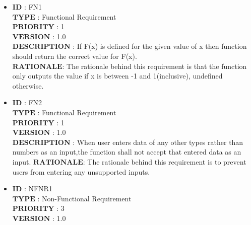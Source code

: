 \documentclass[a4paper,10pt]{report}
\begin{document}
\begin{itemize}
 \item $\textbf{ID}$\hspace{2.51cm}   : FN1\\
   $\textbf{TYPE}$\hspace{1.85cm}   : Functional Requirement\\
   $\textbf{PRIORITY}$\hspace{0.9cm} : 1\\
   $\textbf{VERSION}$\hspace{1.10cm} : 1.0\\
   $\textbf{DESCRIPTION}$\hspace{0.1cm}     : If F(x) is defined for the given value of x then function should return the correct value for F(x).
   \\
    $\textbf{RATIONALE}$\hspace{0.65cm}: The rationale behind this requirement is that the function only outputs the value if x is between -1 and 1(inclusive), undefined otherwise.
\\[1cm]
\item $\textbf{ID}$\hspace{2.51cm}   : FN2\\
   $\textbf{TYPE}$\hspace{1.85cm}   : Functional Requirement\\
   $\textbf{PRIORITY}$\hspace{0.9cm} : 1\\
   $\textbf{VERSION}$\hspace{1.10cm} : 1.0\\
   $\textbf{DESCRIPTION}$\hspace{0.1cm}     : When user enters data of any other types rather than numbers as an input,the function shall not accept that entered data as an input.
    $\textbf{RATIONALE}$\hspace{0.65cm}: The rationale behind this requirement is to prevent users from entering any unsupported inputs.
\\[1cm]
\item $\textbf{ID}$\hspace{2.51cm}   : NFNR1\\
   $\textbf{TYPE}$\hspace{1.85cm}   : Non-Functional Requirement\\
   $\textbf{PRIORITY}$\hspace{0.9cm} : 3\\
   $\textbf{VERSION}$\hspace{1.10cm} : 1.0\\

\end{itemize}
\end{document}

